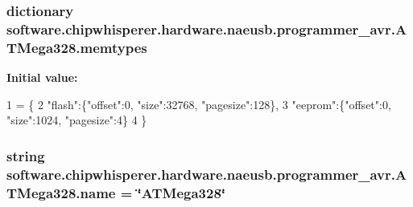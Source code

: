 \subsubsection[{memtypes}]{\setlength{\rightskip}{0pt plus 5cm}dictionary software.\+chipwhisperer.\+hardware.\+naeusb.\+programmer\+\_\+avr.\+A\+T\+Mega328.\+memtypes\hspace{0.3cm}{\ttfamily [static]}}\label{classsoftware_1_1chipwhisperer_1_1hardware_1_1naeusb_1_1programmer__avr_1_1ATMega328_a0ae71c3cc284c6bf094fe48b20298714}
{\bfseries Initial value\+:}
\begin{DoxyCode}
1 = \{
2        \textcolor{stringliteral}{"flash"}:\{\textcolor{stringliteral}{"offset"}:0, \textcolor{stringliteral}{"size"}:32768, \textcolor{stringliteral}{"pagesize"}:128\},
3        \textcolor{stringliteral}{"eeprom"}:\{\textcolor{stringliteral}{"offset"}:0, \textcolor{stringliteral}{"size"}:1024, \textcolor{stringliteral}{"pagesize"}:4\}
4      \}
\end{DoxyCode}
\hypertarget{classsoftware_1_1chipwhisperer_1_1hardware_1_1naeusb_1_1programmer__avr_1_1ATMega328_a417809ff45aa4bc6f977aaf6b349ab86}{}
\subsubsection[{name}]{\setlength{\rightskip}{0pt plus 5cm}string software.\+chipwhisperer.\+hardware.\+naeusb.\+programmer\+\_\+avr.\+A\+T\+Mega328.\+name = \char`\"{}A\+T\+Mega328\char`\"{}\hspace{0.3cm}{\ttfamily [static]}}\label{classsoftware_1_1chipwhisperer_1_1hardware_1_1naeusb_1_1programmer__avr_1_1ATMega328_a417809ff45aa4bc6f977aaf6b349ab86}
\hypertarget{classsoftware_1_1chipwhisperer_1_1hardware_1_1naeusb_1_1programmer__avr_1_1ATMega328_a658db9ba7e3a3e6b1a4bc1b3ce66a915}{}
